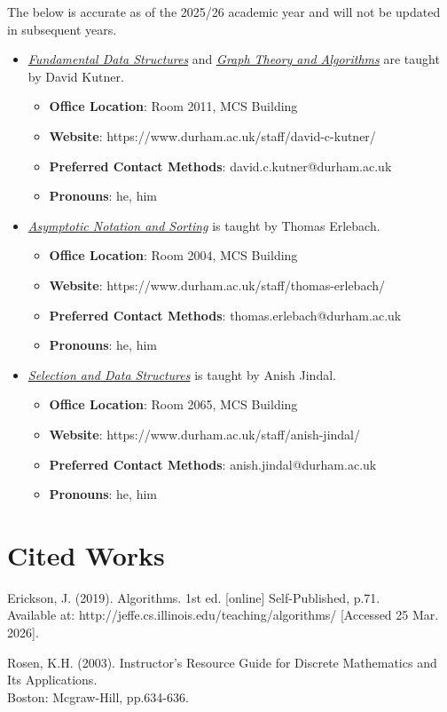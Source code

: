 \documentclass{article}
\newcommand{\separate}[1] {\vspace{#1 pt}\noindent}
\begin{document}
The below is accurate as of the 2025/26 academic year and will not be updated in subsequent years.
\begin{itemize}
    \item \hyperref[part:1.fds]{\textit{Fundamental Data Structures}} and \hyperref[part:4.gta]{\textit{Graph Theory and Algorithms}} are taught by David Kutner.
    \begin{itemize}
        \item \textbf{Office Location}: Room 2011, MCS Building
        \item \textbf{Website}: https://www.durham.ac.uk/staff/david-c-kutner/
        \item \textbf{Preferred Contact Methods}: david.c.kutner@durham.ac.uk
        \item \textbf{Pronouns}: he, him
    \end{itemize}
    
    \item \hyperref[part:2.ans]{\textit{Asymptotic Notation and Sorting}} is taught by Thomas Erlebach.
    \begin{itemize}
        \item \textbf{Office Location}: Room 2004, MCS Building
        \item \textbf{Website}: https://www.durham.ac.uk/staff/thomas-erlebach/
        \item \textbf{Preferred Contact Methods}: thomas.erlebach@durham.ac.uk
        \item \textbf{Pronouns}: he, him
    \end{itemize}
    
    \item \hyperref[part:3.sds]{\textit{Selection and Data Structures}} is taught by Anish Jindal.
    \begin{itemize}
        \item \textbf{Office Location}: Room 2065, MCS Building
        \item \textbf{Website}: https://www.durham.ac.uk/staff/anish-jindal/
        \item \textbf{Preferred Contact Methods}: anish.jindal@durham.ac.uk
        \item \textbf{Pronouns}: he, him
    \end{itemize}
\end{itemize}

\section{Cited Works}

Erickson, J. (2019). Algorithms. 1st ed. [online] Self-Published, p.71. \\ Available at: http://jeffe.cs.illinois.edu/teaching/algorithms/ [Accessed 25 Mar. 2026].\label{cit:1.algorithms}

\separate{5}Rosen, K.H. (2003). Instructor's Resource Guide for Discrete Mathematics and Its Applications. \\ Boston: Mcgraw-Hill, pp.634-636.\label{cit:2.eulerianCircuits}
\end{document}
